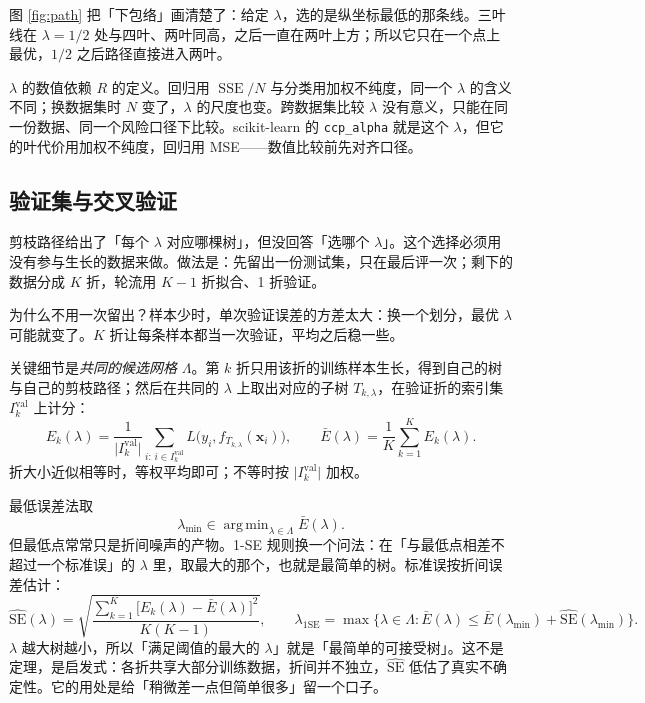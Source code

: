 \documentclass[11pt,a4paper,fontset=windows,zihao=-4]{ctexart}
\newcommand{\bx}{\boldsymbol{x}}
\DeclareMathOperator*{\argmin}{arg\,min}
\DeclareMathOperator{\SSE}{SSE}
\begin{document}
图 \ref{fig:path} 把「下包络」画清楚了：给定 $\lambda$，选的是纵坐标最低的那条线。三叶线在 $\lambda=1/2$ 处与四叶、两叶同高，之后一直在两叶上方；所以它只在一个点上最优，$1/2$ 之后路径直接进入两叶。

\begin{warn}
$\lambda$ 的数值依赖 $R$ 的定义。回归用 $\SSE/N$ 与分类用加权不纯度，同一个 $\lambda$ 的含义不同；换数据集时 $N$ 变了，$\lambda$ 的尺度也变。跨数据集比较 $\lambda$ 没有意义，只能在同一份数据、同一个风险口径下比较。scikit-learn 的 \texttt{ccp\_alpha} 就是这个 $\lambda$，但它的叶代价用加权不纯度，回归用 MSE——数值比较前先对齐口径。
\end{warn}

\subsection{验证集与交叉验证}

剪枝路径给出了「每个 $\lambda$ 对应哪棵树」，但没回答「选哪个 $\lambda$」。这个选择必须用没有参与生长的数据来做。做法是：先留出一份测试集，只在最后评一次；剩下的数据分成 $K$ 折，轮流用 $K-1$ 折拟合、1 折验证。

为什么不用一次留出？样本少时，单次验证误差的方差太大：换一个划分，最优 $\lambda$ 可能就变了。$K$ 折让每条样本都当一次验证，平均之后稳一些。

关键细节是\emph{共同的候选网格} $\Lambda$。第 $k$ 折只用该折的训练样本生长，得到自己的树与自己的剪枝路径；然后在共同的 $\lambda$ 上取出对应的子树 $T_{k,\lambda}$，在验证折的索引集 $I_k^{\mathrm{val}}$ 上计分：
\begin{equation}
  E_k(\lambda)
  =\frac{1}{\lvert I_k^{\mathrm{val}}\rvert}
   \sum_{i:\,i\in I_k^{\mathrm{val}}}
   L\bigl(y_i,f_{T_{k,\lambda}}(\bx_i)\bigr),
  \qquad
  \bar E(\lambda)=\frac1K\sum_{k=1}^K E_k(\lambda).
  \label{eq:cv}
\end{equation}
折大小近似相等时，等权平均即可；不等时按 $\lvert I_k^{\mathrm{val}}\rvert$ 加权。

最低误差法取
\[
  \lambda_{\min}\in\argmin_{\lambda\in\Lambda}\bar E(\lambda).
\]
但最低点常常只是折间噪声的产物。1-SE 规则换一个问法：在「与最低点相差不超过一个标准误」的 $\lambda$ 里，取最大的那个，也就是最简单的树。标准误按折间误差估计：
\begin{equation}
  \widehat{\mathrm{SE}}(\lambda)
  =\sqrt{\frac{\sum_{k=1}^K\bigl[E_k(\lambda)-\bar E(\lambda)\bigr]^2}{K(K-1)}},
  \qquad
  \lambda_{\mathrm{1SE}}
  =\max\bigl\{\lambda\in\Lambda:
       \bar E(\lambda)\le
       \bar E(\lambda_{\min})+\widehat{\mathrm{SE}}(\lambda_{\min})\bigr\}.
  \label{eq:1se}
\end{equation}
$\lambda$ 越大树越小，所以「满足阈值的最大的 $\lambda$」就是「最简单的可接受树」。这不是定理，是启发式：各折共享大部分训练数据，折间并不独立，$\widehat{\mathrm{SE}}$ 低估了真实不确定性。它的用处是给「稍微差一点但简单很多」留一个口子。
\end{document}
